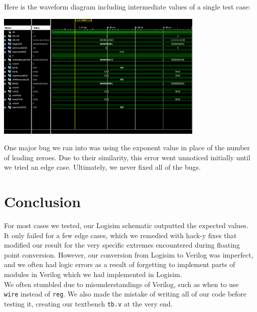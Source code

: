 \documentclass[]{article}
\begin{document}
Here is the waveform diagram including intermediate values of a single test case:

\includegraphics[width=10cm]{waveform.PNG}


One major bug we ran into was using the exponent value in place of the number of leading zeroes. Due to their similarity, this error went unnoticed initially until we tried an edge case. Ultimately, we never fixed all of the bugs.

\section{Conclusion}
For most cases we tested, our Logisim schematic outputted the expected values. It only failed for a few edge cases, which we remedied with hack-y fixes that modified our result for the very specific extremes encountered during floating point conversion. However, our conversion from Logisim to Verilog was imperfect, and we often had logic errors as a result of forgetting to implement parts of modules in Verilog which we had implemented in Logisim.\\

We often stumbled due to misunderstandings of Verilog, such as when to use \texttt{wire} instead of \texttt{reg}. We also made the mistake of writing all of our code before testing it, creating our textbench \texttt{tb.v} at the very end.
\end{document}
